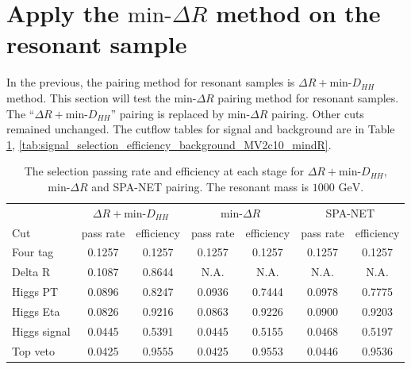 \documentclass[12pt]{article}
\begin{document}
\section{Apply the \texorpdfstring{$\text{min-}\Delta R$}{min delta R} method on the resonant sample}%
\label{sec:apply_the_min_delta_r_method_on_the_resonant_sample}
	In the previous, the pairing method for resonant samples is $\Delta R+\text{min-}D_{HH}$ method. This section will test the $\text{min-}\Delta R$ pairing method for resonant samples. The ``$\Delta R + \text{min-}D_{HH}$'' pairing is replaced by $\text{min-}\Delta R$ pairing. Other cuts remained unchanged. The cutflow tables for signal and background are in Table \ref{tab:signal_selection_efficiency_1000GeV_MV2c10_mindR}, \ref{tab:signal_selection_efficiency_background_MV2c10_mindR}.
	\begin{table}[htpb]
		\centering
		\caption{The selection passing rate and efficiency at each stage for $\Delta R + \text{min-}D_{HH}$, $\text{min-}\Delta R$ and SPA-NET pairing. The resonant mass is $\text{1000 GeV}$.}
		\label{tab:signal_selection_efficiency_1000GeV_MV2c10_mindR}
		\begin{tabular}{l|cc|cc|cc}
				 & \multicolumn{2}{c|}{$\Delta R + \text{min-}D_{HH}$} & \multicolumn{2}{c|}{$\text{min-}\Delta R$} & \multicolumn{2}{c}{SPA-NET} \\
			Cut	 & pass rate               & efficiency               & pass rate           & efficiency          & pass rate    & efficiency   \\ \hline
			Four tag     & 0.1257 & 0.1257 & 0.1257 & 0.1257 & 0.1257 & 0.1257 \\
			Delta R      & 0.1087 & 0.8644 & N.A.   & N.A.   & N.A.   & N.A.   \\
			Higgs PT     & 0.0896 & 0.8247 & 0.0936 & 0.7444 & 0.0978 & 0.7775 \\
			Higgs Eta    & 0.0826 & 0.9216 & 0.0863 & 0.9226 & 0.0900 & 0.9203 \\
			Higgs signal & 0.0445 & 0.5391 & 0.0445 & 0.5155 & 0.0468 & 0.5197 \\
			Top veto     & 0.0425 & 0.9555 & 0.0425 & 0.9553 & 0.0446 & 0.9536
		\end{tabular}
	\end{table}
\end{document}
